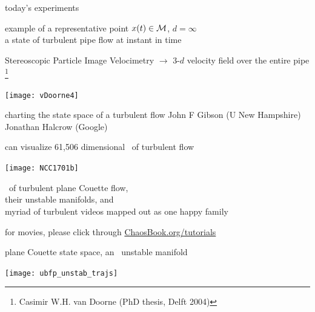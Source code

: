 \begin{frame}{today's experiments}
\begin{block}{example of a representative point }
$x(t) \in \mathcal{M}$, $d= \infty$ \\
a state of turbulent pipe flow at instant in time
\end{block}

\bigskip

Stereoscopic Particle Image Velocimetry $\to$
3-$d$ velocity field over the entire pipe%
\footnote{
Casimir W.H. van Doorne
(PhD thesis, Delft  2004)
}

\bigskip

\begin{center}
\texttt{[image: vDoorne4]}
\end{center}
\end{frame}

\begin{frame}{charting the state space of a turbulent flow}
John F Gibson (U New Hampshire)
\\
Jonathan Halcrow (Google)
\end{frame}

\begin{frame}{can visualize 61,506 dimensional \statesp\ of turbulent flow}
\begin{center}
\texttt{[image: NCC1701b]}
\end{center}
\eqva\ of turbulent plane Couette flow,
\\
their unstable manifolds, and
\\
myriad of turbulent videos mapped out as one happy family

\bigskip

\hfill   {\small
          for movies, please click through
            \textcolor{blue}{\href{http://ChaosBook.org/tutorials}
             {ChaosBook.org/tutorials}}
          }
\end{frame}

\begin{frame}{plane Couette state space, an \eqv\ unstable manifold}
\begin{center}
\texttt{[image: ubfp\_unstab\_trajs]}
\end{center}
\end{frame}

